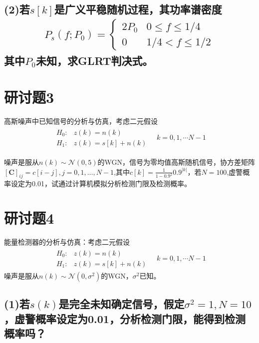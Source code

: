 \documentclass[fontset=windows]{article}
\numberwithin{figure}{section}
\begin{document}
\subsection*{(2)若\(s[k]\)是广义平稳随机过程，其功率谱密度
    \begin{align*}
        P_s(f;P_0)=\left\{
        \begin{matrix}
            2P_0 & 0\leqslant f\leqslant 1/4 \\
            0    & 1/4<f\leqslant1/2
        \end{matrix}\right.
    \end{align*}
    其中\(P_0\)未知，求GLRT判决式。}

\section{研讨题3}

高斯噪声中已知信号的分析与仿真，考虑二元假设
\begin{align*}
    \begin{matrix}
        H_0: & z(k)=n(k)      \\
        H_1: & z(k)=s[k]+n(k)
    \end{matrix}\quad k=0,1,\cdots N-1
\end{align*}

噪声是服从\(n(k)\sim \mathcal{N}(0,5)\)的WGN，信号为零均值高斯随机信号，协方差矩阵\([\mathbf{C}]_{ij}=c[i-j],j=0,1,\ldots,N-1\),其中\(c[k]=\frac{1}{1-0.9^2}0.9^{|k|}\)，若\(N=100\),虚警概率设定为0.01，试通过计算机模拟分析检测门限及检测概率。

\section{研讨题4}

能量检测器的分析与仿真：考虑二元假设
\begin{align*}
    \begin{matrix}
        H_0: & z(k)=n(k)      \\
        H_1: & z(k)=s[k]+n(k)
    \end{matrix}\quad k=0,1,\cdots N-1
\end{align*}
噪声是服从\(n(k)\sim \mathcal{N}(0,\sigma^2)\)的WGN，\(\sigma^2\)已知。

\subsection*{(1)若\(s(k)\)是完全未知确定信号，假定\(\sigma^2=1,N=10\)，虚警概率设定为0.01，分析检测门限，能得到检测概率吗？}
\end{document}
